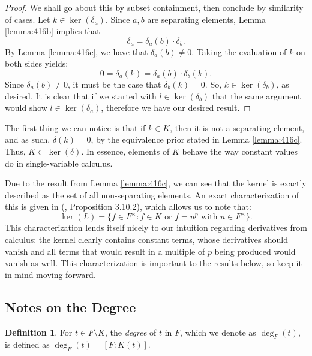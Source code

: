 \documentclass{article}
\theoremstyle{definition}
\newtheorem{definition}{Definition}
\newcommand{\6}{\mathbf}
\newcommand{\7}{\mathcal}
\begin{document}
\begin{proof}
    We shall go about this by subset containment, then conclude by similarity of cases.
    Let $k \in \ker(\delta_a)$. Since $a,b$ are separating elements, Lemma \ref{lemma:416b} implies that
    $$\delta_a = \delta_a(b) \cdot \delta_b.$$
    By Lemma \ref{lemma:416c}, we have that $\delta_a(b) \neq 0$. Taking the evaluation of $k$ on both sides yields:
    $$0 = \delta_a(k) = \delta_a(b) \cdot \delta_b(k).$$
    Since $\delta_a(b) \neq 0$, it must be the case that $\delta_b(k) = 0$. So, $k \in \ker(\delta_b)$, as desired. It is clear that if we started with $l \in \ker(\delta_b)$ that the same argument would show  $l \in \ker(\delta_a)$, therefore we have our desired result.
\end{proof}

\medskip

The first thing we can notice is that if $k \in K$, then it is not a separating element, and as such, $\delta(k) = 0$, by the equivalence prior stated in Lemma \ref{lemma:416c}. Thus, $K \subset \ker(\delta)$. In essence, elements of $K$ behave the way constant values do in single-variable calculus.

\medskip 

Due to the result from Lemma \ref{lemma:416c}, we can see that the kernel is exactly described as the set of all non-separating elements. An exact characterization of this is given in 
(\cite{Stichtenoth93}, Proposition 3.10.2), which allows us to note that:
$$\ker(L) = \{f \in F^{\times} : f \in K \text{ or } f = u^p \text{ with } u \in F^{\times}\}.$$
This characterization lends itself nicely to our intuition regarding derivatives from calculus: the kernel clearly contains constant terms, whose derivatives should vanish and all terms that would result in a multiple of $p$ being produced would vanish as well. This characterization is important to the results below, so keep it in mind moving forward.

\subsection{Notes on the Degree}
\begin{definition}
    For $t \in F \setminus K$, the \textit{degree} of $t$ in $F$, which we denote as $\deg_F(t)$, is defined as $\deg_F(t) = [F : K(t)]$.
\end{definition}
\end{document}
